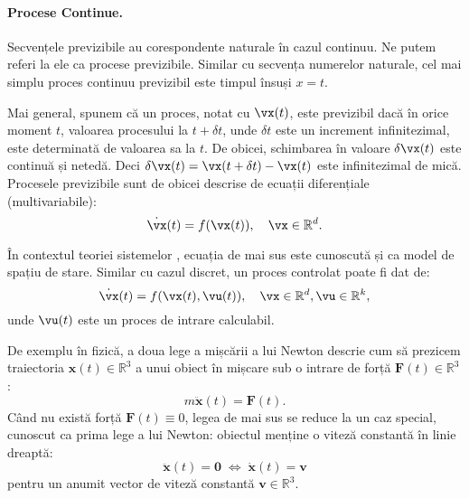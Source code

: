 \documentclass[../../book-main_ro.tex]{subfiles}
\begin{document}
\paragraph{Procese Continue.}
Secvențele previzibile au corespondente naturale în cazul continuu. Ne putem referi la ele ca procese previzibile. Similar cu secvența numerelor naturale, cel mai simplu proces continuu previzibil este timpul însuși $x=t$.

Mai general, spunem că un proces, notat cu $\vx(t)$, este previzibil dacă în orice moment $t$, valoarea procesului la $t+\delta t$, unde $\delta t$ este un increment infinitezimal, este determinată de valoarea sa la $t$. De obicei, schimbarea în valoare $\delta \vx(t)$ este continuă și netedă. Deci $\delta \vx(t) = \vx(t + \delta t) - \vx(t)$ este infinitezimal de mică. Procesele previzibile sunt de obicei descrise de ecuații diferențiale (multivariabile):
\begin{equation}
    \dot{\vx}(t) = f(\vx(t)), \quad \vx \in \mathbb{R}^d.
    \label{eqn:process}
\end{equation}

În contextul teoriei sistemelor \cite{Cal:Des,Sastry-Nonlinear}, ecuația de mai sus este cunoscută și ca model de spațiu de stare. Similar cu cazul discret, un proces controlat poate fi dat de:
\begin{equation}
    \dot{\vx}(t) = f(\vx(t), \vu(t) ), \quad \vx \in \mathbb{R}^d, \vu \in \mathbb{R}^k,
    \label{eqn:process-controlled}
\end{equation}
unde $\vu(t)$ este un proces de intrare calculabil.

\begin{example}
    De exemplu în fizică, a doua lege a mișcării a lui Newton descrie cum să prezicem traiectoria $\boldsymbol{x}(t) \in \mathbb{R}^3$ a unui obiect în mișcare sub o intrare de forță $\boldsymbol{F}(t) \in \mathbb{R}^3$:
\begin{equation}
    m\ddot{\boldsymbol{x}}(t) = \boldsymbol{F}(t).
\end{equation}
Când nu există forță $\boldsymbol{F}(t) \equiv 0$, legea de mai sus se reduce la un caz special, cunoscut ca prima lege a lui Newton: obiectul menține o viteză constantă în linie dreaptă:
\begin{equation}
   \ddot{\boldsymbol{x}}(t) = \boldsymbol{0} \; \Leftrightarrow \; \dot{\boldsymbol{x}}(t) = \boldsymbol{v}
\end{equation}
pentru un anumit vector de viteză constantă $\boldsymbol{v} \in \mathbb{R}^3$.
\end{example}
\end{document}
